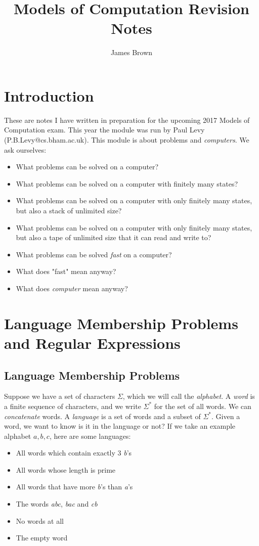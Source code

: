 \documentclass[11pt]{article}
\title{Models of Computation \linebreak Revision Notes}
\author{James Brown}
\begin{document}
	\maketitle
	\newpage
	\tableofcontents
	\newpage
	
	\section{Introduction}
	These are notes I have written in preparation for the upcoming 2017 Models of Computation exam. This year the module was run by Paul Levy (P.B.Levy@cs.bham.ac.uk).
	\linebreak
	This module is about problems and \textit{computers}. We ask ourselves:
	\begin{itemize}
		\item What problems can be solved on a computer?
		\item What problems can be solved on a computer with finitely many states?
		\item What problems can be solved on a computer with only finitely many states, but also a stack of unlimited size?
		\item What problems can be solved on a computer with only finitely many states, but also a tape of unlimited size that it can read and write to?
		\item What problems can be solved \textit{fast} on a computer?
		\item What does "fast" mean anyway?
		\item What does \textit{computer} mean anyway?
	\end{itemize}
	
	\section{Language Membership Problems and Regular Expressions}
	\subsection{Language Membership Problems}
	Suppose we have a set of characters $\Sigma$, which we will call the \textit{alphabet}. A \textit{word} is a finite sequence of characters, and we write $\Sigma^{*}$ for the set of all words. We can \textit{concatenate} words. A \textit{language} is a set of words and a subset of $\Sigma^{*}$. Given a word, we want to know is it in the language or not? If we take an example alphabet ${a, b, c}$, here are some languages:
	\begin{itemize}
		\item All words which contain exactly 3 \textit{b}'s
		\item All words whose length is prime
		\item All words that have more \textit{b}'s than \textit{a}'s
		\item The words \textit{abc}, \textit{bac} and \textit{cb}
		\item No words at all
		\item The empty word
	\end{itemize}
	
\end{document}
